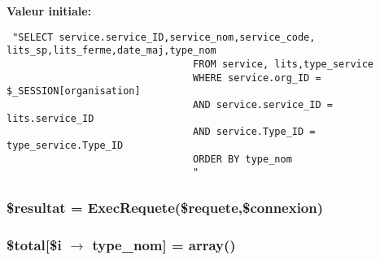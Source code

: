 {\bf Valeur initiale:}

\footnotesize\begin{verbatim} "SELECT service.service_ID,service_nom,service_code, lits_sp,lits_ferme,date_maj,type_nom
                                FROM service, lits,type_service
                                WHERE service.org_ID = $_SESSION[organisation]
                                AND service.service_ID = lits.service_ID
                                AND service.Type_ID = type_service.Type_ID
                                ORDER BY type_nom
                                "
\end{verbatim}\normalsize 
\hypertarget{service__fermeture_8php_a3}{
\subsubsection[\$resultat]{\setlength{\rightskip}{0pt plus 5cm}\$resultat = Exec\-Requete(\$requete,\$connexion)}}
\label{service__fermeture_8php_a3}


\hypertarget{service__fermeture_8php_a5}{
\subsubsection[\$total]{\setlength{\rightskip}{0pt plus 5cm}\$total\mbox{[}\$i $\rightarrow$ type\_\-nom\mbox{]} = array()}}
\label{service__fermeture_8php_a5}


